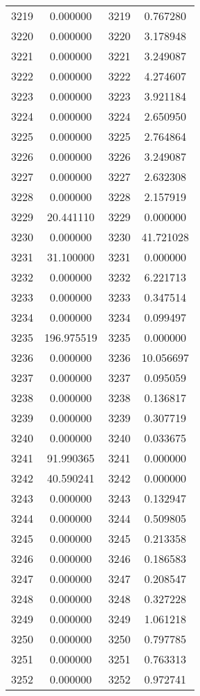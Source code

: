 \documentclass[12pt]{article}
\begin{document}
\begin{longtable}{@{}cccc@{}}
3219 & 0.000000 & 3219 & 0.767280 \\
3220 & 0.000000 & 3220 & 3.178948 \\
3221 & 0.000000 & 3221 & 3.249087 \\
3222 & 0.000000 & 3222 & 4.274607 \\
3223 & 0.000000 & 3223 & 3.921184 \\
3224 & 0.000000 & 3224 & 2.650950 \\
3225 & 0.000000 & 3225 & 2.764864 \\
3226 & 0.000000 & 3226 & 3.249087 \\
3227 & 0.000000 & 3227 & 2.632308 \\
3228 & 0.000000 & 3228 & 2.157919 \\
3229 & 20.441110 & 3229 & 0.000000 \\
3230 & 0.000000 & 3230 & 41.721028 \\
3231 & 31.100000 & 3231 & 0.000000 \\
3232 & 0.000000 & 3232 & 6.221713 \\
3233 & 0.000000 & 3233 & 0.347514 \\
3234 & 0.000000 & 3234 & 0.099497 \\
3235 & 196.975519 & 3235 & 0.000000 \\
3236 & 0.000000 & 3236 & 10.056697 \\
3237 & 0.000000 & 3237 & 0.095059 \\
3238 & 0.000000 & 3238 & 0.136817 \\
3239 & 0.000000 & 3239 & 0.307719 \\
3240 & 0.000000 & 3240 & 0.033675 \\
3241 & 91.990365 & 3241 & 0.000000 \\
3242 & 40.590241 & 3242 & 0.000000 \\
3243 & 0.000000 & 3243 & 0.132947 \\
3244 & 0.000000 & 3244 & 0.509805 \\
3245 & 0.000000 & 3245 & 0.213358 \\
3246 & 0.000000 & 3246 & 0.186583 \\
3247 & 0.000000 & 3247 & 0.208547 \\
3248 & 0.000000 & 3248 & 0.327228 \\
3249 & 0.000000 & 3249 & 1.061218 \\
3250 & 0.000000 & 3250 & 0.797785 \\
3251 & 0.000000 & 3251 & 0.763313 \\
3252 & 0.000000 & 3252 & 0.972741 \\

\end{longtable}
\end{document}
